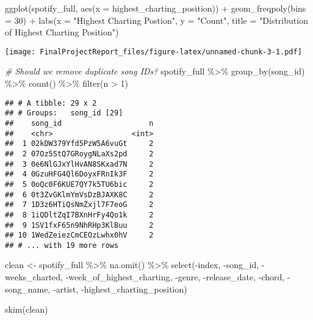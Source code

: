 \documentclass[
]{article}
\newenvironment{Shaded}{\begin{snugshade}}{\end{snugshade}}
\newcommand{\AttributeTok}[1]{\textcolor[rgb]{0.77,0.63,0.00}{#1}}
\newcommand{\CommentTok}[1]{\textcolor[rgb]{0.56,0.35,0.01}{\textit{#1}}}
\newcommand{\DecValTok}[1]{\textcolor[rgb]{0.00,0.00,0.81}{#1}}
\newcommand{\FunctionTok}[1]{\textcolor[rgb]{0.00,0.00,0.00}{#1}}
\newcommand{\NormalTok}[1]{#1}
\newcommand{\OtherTok}[1]{\textcolor[rgb]{0.56,0.35,0.01}{#1}}
\newcommand{\SpecialCharTok}[1]{\textcolor[rgb]{0.00,0.00,0.00}{#1}}
\newcommand{\StringTok}[1]{\textcolor[rgb]{0.31,0.60,0.02}{#1}}
\begin{document}
\begin{Shaded}
\begin{Highlighting}[]
\FunctionTok{ggplot}\NormalTok{(spotify\_full, }\FunctionTok{aes}\NormalTok{(}\AttributeTok{x =}\NormalTok{ highest\_charting\_position)) }\SpecialCharTok{+}
  \FunctionTok{geom\_freqpoly}\NormalTok{(}\AttributeTok{bins =} \DecValTok{30}\NormalTok{) }\SpecialCharTok{+}
  \FunctionTok{labs}\NormalTok{(}\AttributeTok{x =} \StringTok{"Highest Charting Postion"}\NormalTok{, }\AttributeTok{y =} \StringTok{"Count"}\NormalTok{, }\AttributeTok{title =} \StringTok{"Distribution of Highest Charting Position"}\NormalTok{)}
\end{Highlighting}
\end{Shaded}

\texttt{[image: FinalProjectReport\_files/figure-latex/unnamed-chunk-3-1.pdf]}

\begin{Shaded}
\begin{Highlighting}[]
\CommentTok{\# Should we remove duplicate song IDs?}
\NormalTok{spotify\_full }\SpecialCharTok{\%\textgreater{}\%}
  \FunctionTok{group\_by}\NormalTok{(song\_id) }\SpecialCharTok{\%\textgreater{}\%}
  \FunctionTok{count}\NormalTok{() }\SpecialCharTok{\%\textgreater{}\%}
  \FunctionTok{filter}\NormalTok{(n }\SpecialCharTok{\textgreater{}} \DecValTok{1}\NormalTok{)}
\end{Highlighting}
\end{Shaded}

\begin{verbatim}
## # A tibble: 29 x 2
## # Groups:   song_id [29]
##    song_id                    n
##    <chr>                  <int>
##  1 02kDW379Yfd5PzW5A6vuGt     2
##  2 07Oz5StQ7GRoygNLaXs2pd     2
##  3 0e6NlGJxYlHvAN8SKxad7N     2
##  4 0GzuHFG4Ql6DoyxFRnIk3F     2
##  5 0oQc0F6KUE7QY7k5TU6bic     2
##  6 0t3ZvGKlmYmVsDzBJAXK8C     2
##  7 1D3z6HTiQsNmZxjl7F7eoG     2
##  8 1iQDltZqI7BXnHrFy4Qo1k     2
##  9 1SV1fxF65n9NhRHp3KlBuu     2
## 10 1WedZeiezCmCEOzLwhx0hV     2
## # ... with 19 more rows
\end{verbatim}

\begin{Shaded}
\begin{Highlighting}[]
\NormalTok{clean }\OtherTok{\textless{}{-}}\NormalTok{ spotify\_full }\SpecialCharTok{\%\textgreater{}\%}
  \FunctionTok{na.omit}\NormalTok{() }\SpecialCharTok{\%\textgreater{}\%}
  \FunctionTok{select}\NormalTok{(}\SpecialCharTok{{-}}\NormalTok{index, }\SpecialCharTok{{-}}\NormalTok{song\_id, }\SpecialCharTok{{-}}\NormalTok{weeks\_charted, }\SpecialCharTok{{-}}\NormalTok{week\_of\_highest\_charting, }\SpecialCharTok{{-}}\NormalTok{genre, }
         \SpecialCharTok{{-}}\NormalTok{release\_date, }\SpecialCharTok{{-}}\NormalTok{chord, }\SpecialCharTok{{-}}\NormalTok{song\_name, }\SpecialCharTok{{-}}\NormalTok{artist, }\SpecialCharTok{{-}}\NormalTok{highest\_charting\_position)}

\FunctionTok{skim}\NormalTok{(clean)}
\end{Highlighting}
\end{Shaded}
\end{document}
